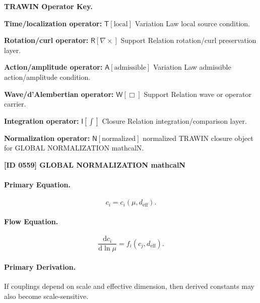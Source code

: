 \par\vspace{0.45\baselineskip}
\noindent\begin{minipage}[t]{\linewidth}
\begingroup
\small
\raggedright
\textbf{TRAWIN Operator Key.}\par
\noindent\textbf{Time/localization operator:} $\mathsf{T}\!\left[\mathrm{local}\right]$ Variation Law local source condition.\par
\noindent\textbf{Rotation/curl operator:} $\mathsf{R}\!\left[\nabla\times\right]$ Support Relation rotation/curl preservation layer.\par
\noindent\textbf{Action/amplitude operator:} $\mathsf{A}\!\left[\mathrm{admissible}\right]$ Variation Law admissible action/amplitude condition.\par
\noindent\textbf{Wave/d'Alembertian operator:} $\mathsf{W}\!\left[\Box\right]$ Support Relation wave or operator carrier.\par
\noindent\textbf{Integration operator:} $\mathsf{I}\!\left[\int\right]$ Closure Relation integration/comparison layer.\par
\noindent\textbf{Normalization operator:} $\mathsf{N}\!\left[\mathrm{normalized}\right]$ normalized TRAWIN closure object for GLOBAL NORMALIZATION mathcalN.\par
\endgroup
\end{minipage}

\clearpage
\noindent\textbf{[ID 0559] GLOBAL NORMALIZATION mathcalN}\par
\vspace{0.35em}
\paragraph{Primary Equation.}
\begin{equation}
c_i=c_i(\mu,d_{\mathrm{eff}}).
\end{equation}

\paragraph{Flow Equation.}
\begin{equation}
\frac{\mathrm{d}c_i}{\mathrm{d}\ln\mu}
=
f_i(c_j,d_{\mathrm{eff}}).
\end{equation}

\paragraph{Primary Derivation.}
If couplings depend on scale and effective dimension, then derived constants may also become scale-sensitive.

